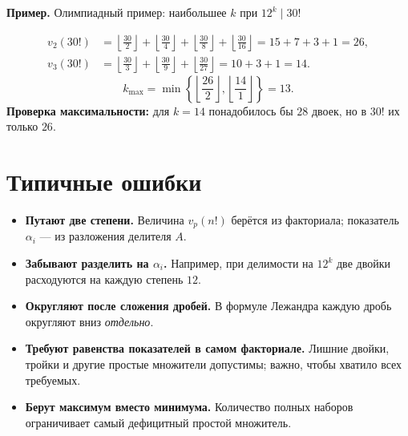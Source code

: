 \documentclass[a4paper,11pt]{article}
\newcommand{\ex}[1]{\par\medskip\textcolor{deepaccent}{\textbf{Пример.} #1}\par\smallskip}
\newcommand{\nuval}[2]{v_{#1}(#2)}
\begin{document}
\ex{Олимпиадный пример: наибольшее $k$ при $12^k\mid30!$}
\begin{align*}
\nuval{2}{30!}&=\left\lfloor\frac{30}{2}\right\rfloor+
\left\lfloor\frac{30}{4}\right\rfloor+
\left\lfloor\frac{30}{8}\right\rfloor+
\left\lfloor\frac{30}{16}\right\rfloor
=15+7+3+1=26,\\
\nuval{3}{30!}&=\left\lfloor\frac{30}{3}\right\rfloor+
\left\lfloor\frac{30}{9}\right\rfloor+
\left\lfloor\frac{30}{27}\right\rfloor
=10+3+1=14.
\end{align*}
\[
 k_{\max}=\min\left\{\left\lfloor\frac{26}{2}\right\rfloor,
\left\lfloor\frac{14}{1}\right\rfloor\right\}=\boxed{13}.
\]
\textbf{Проверка максимальности:} для $k=14$ понадобилось бы $28$ двоек, но в $30!$ их только $26$.

\section{Типичные ошибки}
\begin{itemize}
\item \textbf{Путают две степени.} Величина $\nuval p{n!}$ берётся из факториала; показатель $\alpha_i$ --- из разложения делителя $A$.
\item \textbf{Забывают разделить на $\alpha_i$.} Например, при делимости на $12^k$ две двойки расходуются на каждую степень $12$.
\item \textbf{Округляют после сложения дробей.} В формуле Лежандра каждую дробь округляют вниз \textit{отдельно}.
\item \textbf{Требуют равенства показателей в самом факториале.} Лишние двойки, тройки и другие простые множители допустимы; важно, чтобы хватило всех требуемых.
\item \textbf{Берут максимум вместо минимума.} Количество полных наборов ограничивает самый дефицитный простой множитель.
\end{itemize}

\clearpage
\end{document}

